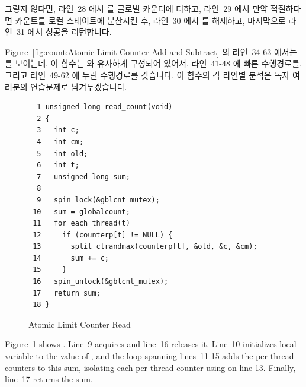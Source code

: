 그렇지 않다면, 라인~28 에서  를 글로벌 카운터에 더하고, 라인~29 에서
만약 적절하다면 카운트를 로컬 스테이트에 분산시킨 후, 라인~30 에서
 를 해제하고, 마지막으로 라인~31 에서 성공을 리턴합니다.

Figure~\ref{fig:count:Atomic Limit Counter Add and Subtract} 의 라인~34-63
에서는  를 보이는데, 이 함수는  와 유사하게
구성되어 있어서, 라인~41-48 에 빠른 수행경로를, 그리고 라인~49-62 에 누린
수행경로를 갖습니다.
이 함수의 각 라인별 분석은 독자 여러분의 연습문제로 남겨두겠습니다.

\begin{figure}[tbp]
{ \scriptsize
\begin{verbatim}
  1 unsigned long read_count(void)
  2 {
  3   int c;
  4   int cm;
  5   int old;
  6   int t;
  7   unsigned long sum;
  8 
  9   spin_lock(&gblcnt_mutex);
 10   sum = globalcount;
 11   for_each_thread(t)
 12     if (counterp[t] != NULL) {
 13       split_ctrandmax(counterp[t], &old, &c, &cm);
 14       sum += c;
 15     }
 16   spin_unlock(&gblcnt_mutex);
 17   return sum;
 18 }
\end{verbatim}
}
\caption{Atomic Limit Counter Read}
\label{fig:count:Atomic Limit Counter Read}
\end{figure}

Figure~\ref{fig:count:Atomic Limit Counter Read} shows .
Line~9 acquires  and line~16 releases it.
Line~10 initializes local variable  to the value of
, and the loop spanning lines~11-15 adds the
per-thread counters to this sum, isolating each per-thread counter
using  on line 13.
Finally, line~17 returns the sum.


